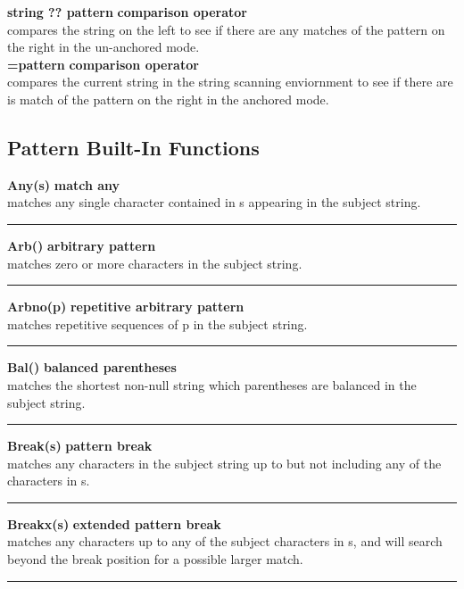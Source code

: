 \documentclass{article}
\begin{document}
\noindent\textbf{string ?? pattern} \hfill\textbf{comparison operator}\\
compares the string on the left to see if there are any matches of the pattern on the right in the un-anchored mode.\\

\noindent\textbf{=pattern} \hfill\textbf{comparison operator}\\
compares the current string in the string scanning enviornment to see if there are is match of the pattern on the right in the anchored mode.\\

\subsection{Pattern Built-In Functions}
\noindent\textbf{Any(s)} \hfill\textbf{match any}\\
matches any single character contained in s appearing in the subject string.\\
\noindent\rule{12cm}{0.1pt}

\noindent\textbf{Arb()} \hfill\textbf{arbitrary pattern}\\
matches zero or more characters in the subject string.\\
\noindent\rule{12cm}{0.1pt}

\noindent\textbf{Arbno(p)} \hfill\textbf{repetitive arbitrary pattern}\\
matches repetitive sequences of p in the subject string.\\
\noindent\rule{12cm}{0.1pt}

\noindent\textbf{Bal()} \hfill\textbf{balanced parentheses}\\
matches the shortest non-null string which parentheses are balanced in the subject string.\\
\noindent\rule{12cm}{0.1pt}

\noindent\textbf{Break(s)} \hfill\textbf{pattern break}\\
matches any characters in the subject string up to but not including any of the characters in s.\\
\noindent\rule{12cm}{0.1pt}

\noindent\textbf{Breakx(s)} \hfill\textbf{extended pattern break}\\
matches any characters up to any of the subject characters in s, and will search beyond the break position for a possible larger match.\\
\noindent\rule{12cm}{0.1pt}
\end{document}
